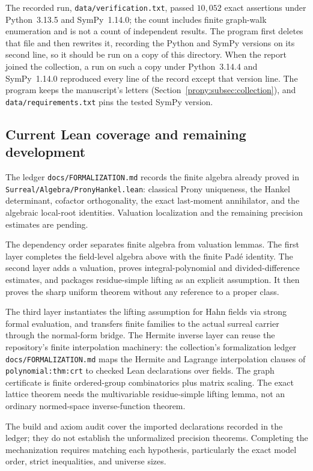 \documentclass[11pt,letterpaper]{article}
\theoremstyle{definition}
\theoremstyle{remark}
\newcommand{\lbl}[1]{\nolinkurl{#1}}%
\begin{document}
The recorded run, \lbl{data/verification.txt}, passed $10{,}052$ exact
assertions under Python~3.13.5 and SymPy~1.14.0; the count includes finite
graph-walk enumeration and is not a count of independent results. The
program first deletes that file and then rewrites it, recording the Python
and SymPy versions on its second line, so it should be run on a copy of this
directory. When the report joined the collection, a run on such a copy under
Python~3.14.4 and SymPy~1.14.0 reproduced every line of the record except
that version line. The program keeps the manuscript's letters
(Section~\ref{prony:subsec:collection}), and
\lbl{data/requirements.txt} pins the tested SymPy version.

\subsection{Current Lean coverage and remaining development}
The ledger \lbl{docs/FORMALIZATION.md} records the finite algebra already
proved in \lbl{Surreal/Algebra/PronyHankel.lean}: classical Prony uniqueness,
the Hankel determinant, cofactor orthogonality, the exact last-moment
annihilator, and the algebraic local-root identities.
Valuation localization and the remaining precision estimates are pending.

The dependency order separates finite algebra from valuation lemmas.
The first layer completes the field-level algebra above with the finite
Pad\'e identity. The second layer adds a valuation, proves integral-polynomial
and divided-difference estimates, and packages residue-simple lifting as an
explicit assumption. It then proves the sharp uniform theorem without any
reference to a proper class.

The third layer instantiates the lifting assumption for Hahn fields via
strong formal evaluation, and transfers finite families to the actual
surreal carrier through the normal-form bridge. The Hermite inverse layer
can reuse the repository's finite interpolation machinery: the collection's
formalization ledger \lbl{docs/FORMALIZATION.md} maps the Hermite and
Lagrange interpolation clauses of \lbl{polynomial:thm:crt} to checked Lean
declarations over fields. The graph
certificate is finite ordered-group combinatorics plus matrix scaling.
The exact lattice theorem needs the multivariable residue-simple lifting
lemma, not an ordinary normed-space inverse-function theorem.

The build and axiom audit cover the imported declarations recorded in the
ledger; they do not establish the unformalized precision theorems.
Completing the mechanization requires matching each
hypothesis, particularly the exact model order, strict inequalities, and
universe sizes.
\end{document}

